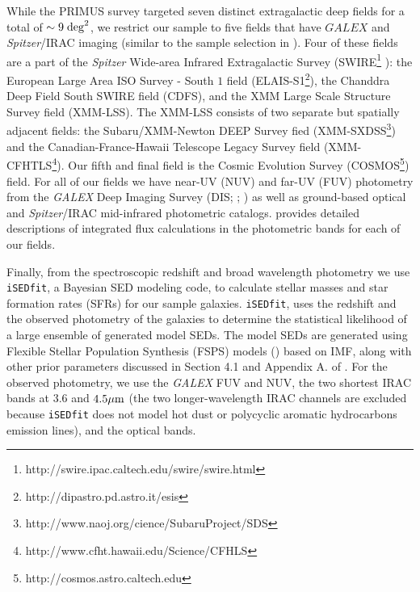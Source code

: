 \documentclass{emulateapj}
\begin{document}
While the PRIMUS survey targeted seven distinct extragalactic deep fields for a total of $\sim 9 \; \rm{deg}^2$, we restrict our sample to five fields that have $GALEX$ and {\em Spitzer}/IRAC imaging (similar to the sample selection in \cite{Moustakas:2013aa}). Four of these fields are a part of the {\em Spitzer} Wide-area Infrared Extragalactic Survey (SWIRE\footnote{http://swire.ipac.caltech.edu/swire/swire.html} ): the European Large Area ISO Survey - South $1$ field (ELAIS-S1\footnote{http://dipastro.pd.astro.it/esis}), the Chanddra Deep Field South SWIRE field (CDFS), and the XMM Large Scale Structure Survey field (XMM-LSS). The XMM-LSS consists of two separate but spatially adjacent fields: the Subaru/XMM-Newton DEEP Survey fied (XMM-SXDSS\footnote{http://www.naoj.org/cience/SubaruProject/SDS}) and the Canadian-France-Hawaii Telescope Legacy Survey field (XMM-CFHTLS\footnote{http://www.cfht.hawaii.edu/Science/CFHLS}). Our fifth and final field is the Cosmic Evolution Survey (COSMOS\footnote{http://cosmos.astro.caltech.edu}) field. For all of our fields we have near-UV (NUV) and far-UV (FUV) photometry from the {\em GALEX} Deep Imaging Survey (DIS; \cite{Martin:2005aa}; \cite{Morrissey:2005aa}) as well as ground-based optical and {\em Spitzer}/IRAC mid-infrared photometric catalogs. \cite{Moustakas:2013aa} provides detailed descriptions of integrated flux calculations in the photometric bands for each of our fields. 

Finally, from the spectroscopic redshift and broad wavelength photometry we use \texttt{iSEDfit}, a Bayesian SED modeling code, to calculate stellar masses and star formation rates (SFRs) for our sample galaxies. \texttt{iSEDfit}, uses the redshift and the observed photometry of the galaxies to determine the statistical likelihood of a large ensemble of generated model SEDs. The model SEDs are generated using Flexible Stellar Population Synthesis (FSPS) models (\cite{Conroy:2010aa}) based on \cite{Chabrier:2003aa} IMF, along with other prior parameters discussed in Section 4.1 and Appendix A. of \cite{Moustakas:2013aa}. For the observed photometry, we use the {\em GALEX} FUV and NUV, the two shortest IRAC bands at $3.6$ and $4.5 \mu \rm{m}$ (the two longer-wavelength IRAC channels are excluded because \texttt{iSEDfit} does not model hot dust or polycyclic aromatic hydrocarbons emission lines), and the optical bands. 
\end{document}
